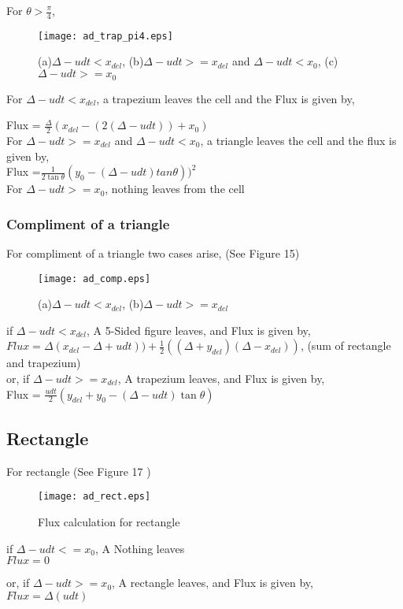 For $\theta>\frac{\pi}{4}$, \\
\begin{figure}[H]
 \texttt{[image: ad\_trap\_pi4.eps]}
 \caption[Different cases for flux calculation for trapezium]{(a)$\Delta-udt<x_{del}$, (b)$\Delta-udt>=x_{del}$ and $\Delta-udt<x_0$, (c)$\Delta-udt>=x_0$}
\end{figure}

For $\Delta-udt<x_{del}$, a trapezium leaves the cell and the Flux is given by,

Flux = $\frac{\Delta}{2}(x_{del} - (2(\Delta - udt)) + x_0)$\\

For $\Delta-udt>=x_{del}$ and $\Delta-udt<x_0$, a triangle leaves the cell and the flux is given by, \\
Flux =$\frac{1}{2\tan\theta} (y_0 - (\Delta - udt)tan\theta))^2$ \\

For $\Delta-udt>=x_0$, nothing leaves from the cell \\

\subsubsection{Compliment of a triangle}
For compliment of a triangle two cases arise, (See Figure 15)
\begin{figure}[H]
 \centering
 \texttt{[image: ad\_comp.eps]}
 \caption[Different cases for flux calculation for compliment of a triangle]{(a)$\Delta -udt < x_{del}$, (b)$\Delta -udt >= x_{del}$}
\end{figure}

if $\Delta -udt < x_{del}$, A 5-Sided figure leaves,  and Flux is given by, \\
$Flux = \Delta(x_{del} - \Delta + udt)) + \frac{1}{2}((\Delta + y_{del})(\Delta - x_{del}))$,  (sum of rectangle and trapezium) \\

or, if $\Delta -udt >= x_{del}$, A trapezium leaves, and Flux is given by, \\
Flux =  $\frac{udt}{2}( y_{del} + y_0 - (\Delta - udt)\tan\theta)$

  
\subsection{Rectangle}
For rectangle (See Figure 17 )
\begin{figure}[H]
 \centering
 \texttt{[image: ad\_rect.eps]}
 \caption{Flux calculation for rectangle}
\end{figure}

if $\Delta -udt <= x_{0}$, A Nothing leaves \\
$Flux = 0$

or, if $\Delta -udt >= x_{0}$, A rectangle leaves, and Flux is given by, \\
$Flux =  \Delta(udt)$


